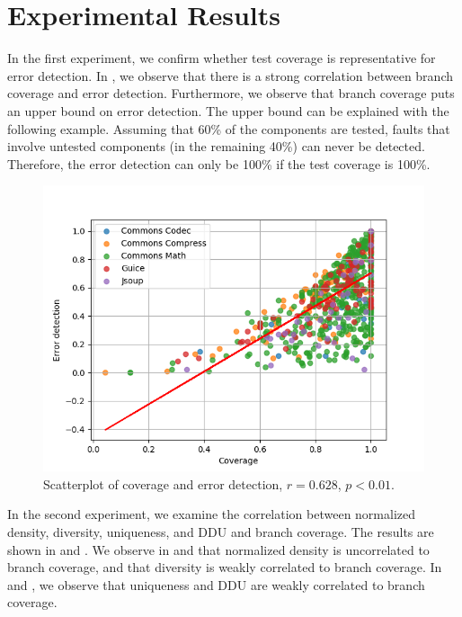 \documentclass[twoside,a4paper,11pt]{memoir}
\begin{document}
\section{Experimental Results}
In the first experiment, we confirm whether test coverage is representative for error detection.
In , we observe that there is a strong correlation between branch coverage and error detection.
Furthermore, we observe that branch coverage puts an upper bound on error detection.
The upper bound can be explained with the following example.
Assuming that 60\% of the components are tested, faults that involve untested components (in the remaining 40\%) can never be detected.
Therefore, the error detection can only be 100\% if the test coverage is 100\%.
\begin{figure}
  \includegraphics[width=\linewidth]{figures/coverage_error_detection}
  \caption{Scatterplot of coverage and error detection, \(r = 0.628 \), \(p < 0.01 \).}%
  \label{fig:coverage_error_detection}
\end{figure}

In the second experiment, we examine the correlation between normalized density, diversity, uniqueness, and DDU and branch coverage.
The results are shown in  and .
We observe in  and  that normalized density is uncorrelated to branch coverage, and that diversity is weakly correlated to branch coverage.
In  and , we observe that uniqueness and DDU are weakly correlated to branch coverage.
\end{document}
